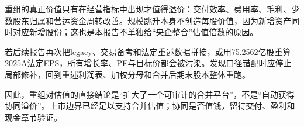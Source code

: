 重组的真正价值只有在经营指标中出现才值得溢价：交付效率、费用率、毛利、少数股东归属和营运资金周转改善。规模跳升本身不创造每股价值，因为新增资产同时对应新增股份；这也是本报告不单独给“央企整合”估值倍数的原因。

\begin{riskbox}[口径失效风险]
若后续报告再次把legacy、交易备考和法定重述数据拼接，或用75.2562亿股重算2025A法定EPS，所有增长率、PE与目标价都会被污染。发现口径错配时应停止局部修补，回到重述利润表、加权分母和合并后期末股本整体重跑。
\end{riskbox}

因此，重组对估值的直接结论是“扩大了一个可审计的合并平台”，不是“自动获得协同溢价”。上市边界已经足以支持合并估值；协同是否值钱，留待交付、盈利和现金章节验证。
